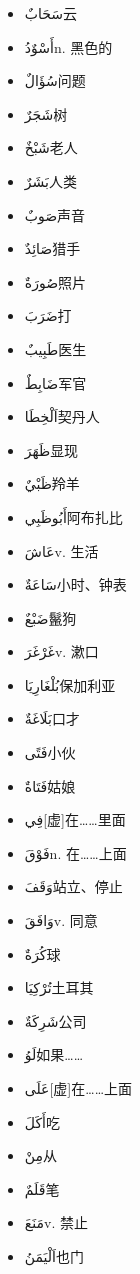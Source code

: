 \begin{multicols}{2}
\begin{itemize}
    \item {} \ac{سَحَابٌ}{云}
    \item \ac{أَسْوٌدُ}{n. 黑色的}
    \item \ac{سُؤَالٌ}{问题}
    \item \ac{شَجَرٌ}{树}
    \item \ac{شَبْخٌ}{老人}
    \item \ac{بَشَرٌ}{人类}
    \item \ac{صَوبٌ}{声音}
    \item \ac{صَائِدٌ}{猎手}
    \item \ac{صُورَةٌ}{照片}
    \item \ac{ضَرَبَ}{打}
    \item \ac{طَبِيبٌ}{医生}
    \item \ac{ضَابِطٌ}{军官}
    \item \ac{اَلْخِطَا}{契丹人}
    \item \ac{ظَهَرَ}{显现}
    \item \ac{ظَبْيٌ}{羚羊}
    \item \ac{أَبُوظَبِي}{阿布扎比}
    \item \ac{عَاشَ}{v. 生活}
    \item \ac{سَاعَةٌ}{小时、钟表}
    \item \ac{ضَبْعٌ}{鬣狗}
    \item \ac{غَرْغَرَ}{v. 漱口}
    \item \ac{بُلْغَارِيَا}{保加利亚}
    \item \ac{بَلَاغَةٌ}{口才}
    
    \item {} \ac{فَتًى}{小伙}
    \item \ac{فَتَاةٌ}{姑娘}
    \item \ac{فِي}{[虚]在……里面}
    \item \ac{فَوْقَ}{n. 在……上面}
    \item \ac{وَقَفَ}{站立、停止}
    \item \ac{وَافَقَ}{v. 同意}
    \item \ac{كُرَةٌ}{球}
    \item \ac{تُرْكِيَا}{土耳其}
    \item \ac{شَرِكَةٌ}{公司}
    \item \ac{لَوُ}{如果……}
    \item \ac{عَلَى}{[虚]在……上面}
    \item \ac{أَكَلَ}{吃}
    \item \ac{مِنْ}{从}
    \item \ac{قَلَمٌ}{笔}
    \item \ac{مَنَعَ}{v. 禁止}
    \item \ac{اَلْيَمَنُ}{也门}
\end{itemize}
\end{multicols}

